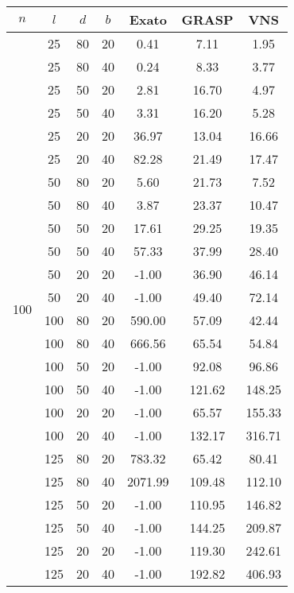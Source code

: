 \begin{tabular}{ |c|c|c|c||c c c| }
\hline
$ n $ & $ l $ & $ d $ & $ b $ & Exato & GRASP & VNS \\
\hline
\multirow{24}{*}{100} & 25 & 80 & 20 &   0.41 &   7.11 &   1.95 \\
& 25 & 80 & 40 &   0.24 &   8.33 &   3.77 \\
\cline{3-4}& 25 & 50 & 20 &   2.81 &  16.70 &   4.97 \\
& 25 & 50 & 40 &   3.31 &  16.20 &   5.28 \\
\cline{3-4}& 25 & 20 & 20 &  36.97 &  13.04 &  16.66 \\
& 25 & 20 & 40 &  82.28 &  21.49 &  17.47 \\
\cline{3-4}\cline{2-2}& 50 & 80 & 20 &   5.60 &  21.73 &   7.52 \\
& 50 & 80 & 40 &   3.87 &  23.37 &  10.47 \\
\cline{3-4}& 50 & 50 & 20 &  17.61 &  29.25 &  19.35 \\
& 50 & 50 & 40 &  57.33 &  37.99 &  28.40 \\
\cline{3-4}& 50 & 20 & 20 &  -1.00 &  36.90 &  46.14 \\
& 50 & 20 & 40 &  -1.00 &  49.40 &  72.14 \\
\cline{3-4}\cline{2-2}& 100 & 80 & 20 & 590.00 &  57.09 &  42.44 \\
& 100 & 80 & 40 & 666.56 &  65.54 &  54.84 \\
\cline{3-4}& 100 & 50 & 20 &  -1.00 &  92.08 &  96.86 \\
& 100 & 50 & 40 &  -1.00 & 121.62 & 148.25 \\
\cline{3-4}& 100 & 20 & 20 &  -1.00 &  65.57 & 155.33 \\
& 100 & 20 & 40 &  -1.00 & 132.17 & 316.71 \\
\cline{3-4}\cline{2-2}& 125 & 80 & 20 & 783.32 &  65.42 &  80.41 \\
& 125 & 80 & 40 & 2071.99 & 109.48 & 112.10 \\
\cline{3-4}& 125 & 50 & 20 &  -1.00 & 110.95 & 146.82 \\
& 125 & 50 & 40 &  -1.00 & 144.25 & 209.87 \\
\cline{3-4}& 125 & 20 & 20 &  -1.00 & 119.30 & 242.61 \\
& 125 & 20 & 40 &  -1.00 & 192.82 & 406.93 \\
\cline{3-4}\cline{2-2}\cline{1-1}\hline
\end{tabular}
